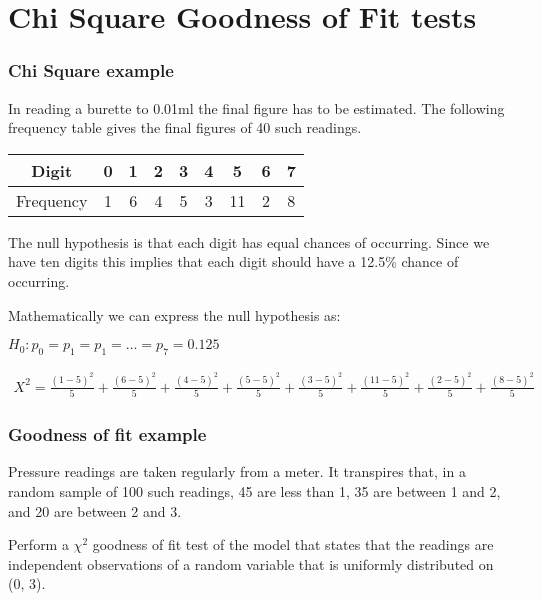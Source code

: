 \documentclass[00-IntroStatsMaster.tex]{subfiles}
\begin{document}
	
\chapter{Chi Square Goodness of Fit tests}




\subsection{Chi Square example}
In reading a burette to 0.01ml the final figure has to be estimated.
The following frequency table gives the final figures of 40 such readings.

\begin{center}
\begin{tabular}{|c|c|c|c|c|c|c|c|c|}
	\hline
	Digit & 0 & 1 & 2 & 3 & 4 & 5 & 6 & 7 \\ \hline
	Frequency& 1 & 6 & 4 & 5 & 3 & 11 & 2 & 8 \\
	\hline
\end{tabular}
\end{center}


The null hypothesis is that each digit has equal chances of occurring. Since we have ten digits this implies that each digit should have a 12.5\% chance of occurring.

Mathematically we can express the null hypothesis as:

$H_{0}: p_{0} = p_{1} = p_{1}= \dots = p_{7} = 0.125$

\begin{eqnarray}
X^2
=\frac{(1 - 5)^2}{5} + \frac{(6 - 5)^2}{5} +\frac{(4 - 5)^2}{5} + \frac{(5 - 5)^2}{5}
+ \frac{(3 - 5)^2}{5}+ \frac{(11 - 5)^2}{5}+ \frac{(2 - 5)^2}{5}+
\frac{(8 - 5)^2}{5}
\end{eqnarray}


\subsection{ Goodness of fit example}


Pressure readings are taken regularly from a meter. It transpires that, in a random
sample of 100 such readings, 45 are less than 1, 35 are between 1 and 2, and 20 are
between 2 and 3.

Perform a $\chi^2$ goodness of fit test of the model that states that the readings are
independent observations of a random variable that is uniformly distributed on (0, 3).
\end{document}
